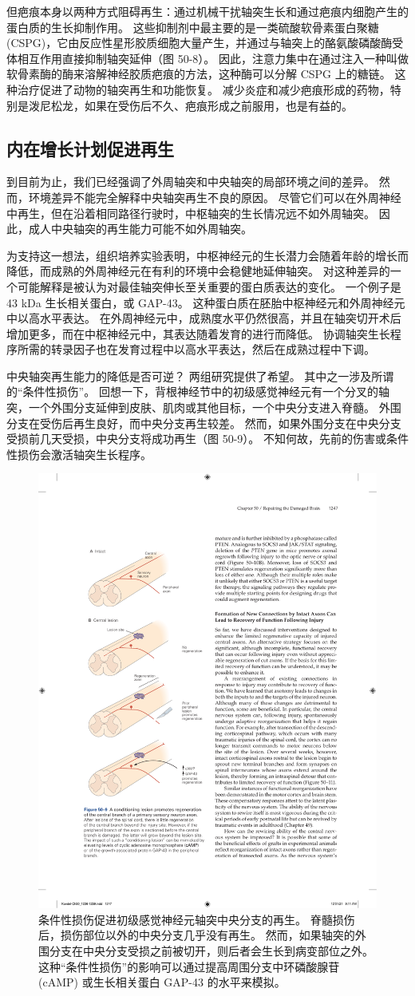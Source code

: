 但疤痕本身以两种方式阻碍再生：通过机械干扰轴突生长和通过疤痕内细胞产生的蛋白质的生长抑制作用。 这些抑制剂中最主要的是一类硫酸软骨素蛋白聚糖 (CSPG)，它由反应性星形胶质细胞大量产生，并通过与轴突上的酪氨酸磷酸酶受体相互作用直接抑制轴突延伸（图 50-8）。 因此，注意力集中在通过注入一种叫做软骨素酶的酶来溶解神经胶质疤痕的方法，这种酶可以分解 CSPG 上的糖链。 这种治疗促进了动物的轴突再生和功能恢复。 减少炎症和减少疤痕形成的药物，特别是泼尼松龙，如果在受伤后不久、疤痕形成之前服用，也是有益的。

\subsection{内在增长计划促进再生}
到目前为止，我们已经强调了外周轴突和中央轴突的局部环境之间的差异。 然而，环境差异不能完全解释中央轴突再生不良的原因。 尽管它们可以在外周神经中再生，但在沿着相同路径行驶时，中枢轴突的生长情况远不如外周轴突。 因此，成人中央轴突的再生能力可能不如外周轴突。

为支持这一想法，组织培养实验表明，中枢神经元的生长潜力会随着年龄的增长而降低，而成熟的外周神经元在有利的环境中会稳健地延伸轴突。 对这种差异的一个可能解释是被认为对最佳轴突伸长至关重要的蛋白质表达的变化。 一个例子是 43 kDa 生长相关蛋白，或 GAP-43。 这种蛋白质在胚胎中枢神经元和外周神经元中以高水平表达。 在外周神经元中，成熟度水平仍然很高，并且在轴突切开术后增加更多，而在中枢神经元中，其表达随着发育的进行而降低。 协调轴突生长程序所需的转录因子也在发育过程中以高水平表达，然后在成熟过程中下调。


中央轴突再生能力的降低是否可逆？ 两组研究提供了希望。 其中之一涉及所谓的“条件性损伤”。 回想一下，背根神经节中的初级感觉神经元有一个分叉的轴突，一个外围分支延伸到皮肤、肌肉或其他目标，一个中央分支进入脊髓。 外围分支在受伤后再生良好，而中央分支再生较差。 然而，如果外围分支在中央分支受损前几天受损，中央分支将成功再生（图 50-9）。 
不知何故，先前的伤害或条件性损伤会激活轴突生长程序。


\begin{figure}[htbp]
	\centering
	\includegraphics[width=0.5\linewidth]{chap50/fig_50_9}
	\caption{条件性损伤促进初级感觉神经元轴突中央分支的再生。 脊髓损伤后，损伤部位以外的中央分支几乎没有再生。 然而，如果轴突的外围分支在中央分支受损之前被切开，则后者会生长到病变部位之外。 这种“条件性损伤”的影响可以通过提高周围分支中环磷酸腺苷 (cAMP) 或生长相关蛋白 GAP-43 的水平来模拟。}
	\label{fig:50_9}
\end{figure}

